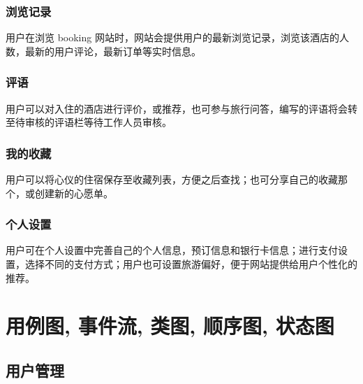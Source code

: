 \documentclass[11pt]{article}
\begin{document}
		\subsubsection{浏览记录}
		用户在浏览 booking 网站时，网站会提供用户的最新浏览记录，浏览该酒店的人数，最新的用户评论，最新订单等实时信息。
		
        \subsubsection{评语}
        用户可以对入住的酒店进行评价，或推荐，也可参与旅行问答，编写的评语将会转至待审核的评语栏等待工作人员审核。
        \subsubsection{我的收藏}
        用户可以将心仪的住宿保存至收藏列表，方便之后查找；也可分享自己的收藏那个，或创建新的心愿单。
        \subsubsection{个人设置}
        用户可在个人设置中完善自己的个人信息，预订信息和银行卡信息；进行支付设置，选择不同的支付方式；用户也可设置旅游偏好，便于网站提供给用户个性化的推荐。
		
		




\pagebreak
{}
\section{用例图, 事件流, 类图, 顺序图, 状态图}



	\subsection{用户管理}
	
\end{document}
